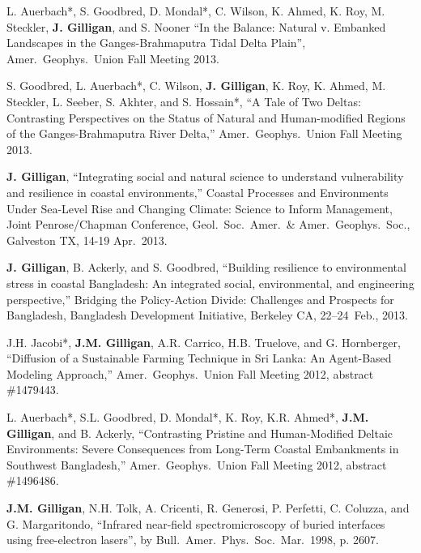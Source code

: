     \item L. Auerbach*, S. Goodbred, D. Mondal*, C. Wilson, K. Ahmed, K. Roy, M. Steckler, \textbf{J. Gilligan}, and S. Nooner
    \enquote{In the Balance: Natural v. Embanked Landscapes in the Ganges-Brahmaputra Tidal Delta Plain},
    Amer.\ Geophys.\ Union Fall Meeting 2013.

    \item S. Goodbred, L. Auerbach*, C. Wilson, \textbf{J. Gilligan}, K. Roy, K. Ahmed, M. Steckler, L. Seeber, S. Akhter, and S. Hossain*,
    \enquote{A Tale of Two Deltas: Contrasting Perspectives on the Status of Natural and Human-modified Regions of the Ganges-Brahmaputra River Delta,}
    Amer.\ Geophys.\ Union Fall Meeting 2013.

    \item \textbf{J. Gilligan},
    \enquote{Integrating social and natural science to understand vulnerability and resilience in coastal environments,}
    Coastal Processes and Environments Under Sea-Level Rise and Changing Climate: Science to Inform Management, Joint Penrose/Chapman Conference,
    Geol.\ Soc.\ Amer.\ \& Amer.\ Geophys.\ Soc., Galveston TX, 14-19 Apr.~2013.

    \item \textbf{J. Gilligan}, B. Ackerly, and S. Goodbred,
    \enquote{Building resilience to environmental stress in coastal Bangladesh: An integrated social, environmental, and engineering perspective,}
    Bridging the Policy-Action Divide: Challenges and Prospects for Bangladesh, Bangladesh Development Initiative, Berkeley CA, 22--24~Feb., 2013.

    \item J.H. Jacobi*, \textbf{J.M. Gilligan}, A.R. Carrico, H.B. Truelove, and G. Hornberger,
    \enquote{Diffusion of a Sustainable Farming Technique in Sri Lanka: An Agent-Based Modeling Approach,}
    Amer.\ Geophys.\ Union Fall Meeting 2012, abstract \#1479443.

    \item
    L. Auerbach*, S.L. Goodbred, D. Mondal*, K. Roy, K.R. Ahmed*, \textbf{J.M. Gilligan}, and B. Ackerly,
    \enquote{Contrasting Pristine and Human-Modified Deltaic Environments: Severe Consequences from Long-Term Coastal Embankments in Southwest Bangladesh,}
    Amer.\ Geophys.\ Union Fall Meeting 2012, abstract \#1496486.

    \item \textbf{J.M. Gilligan}, N.H. Tolk, A. Cricenti, R. Generosi, P. Perfetti, C. Coluzza, and G. Margaritondo,
    \enquote{Infrared near-field spectromicroscopy of buried interfaces using free-electron lasers}, by
    Bull.\ Amer.\ Phys.\ Soc.\ Mar.~1998, p. 2607.

